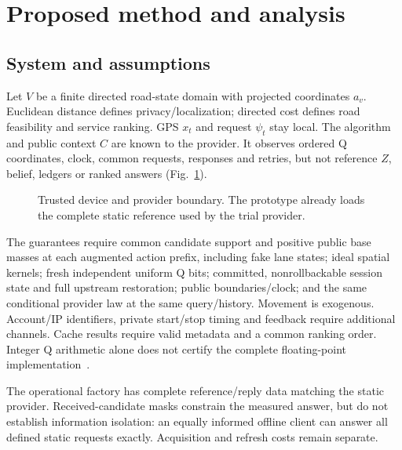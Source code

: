 \section{Proposed method and analysis}\label{sec:method}
\subsection{System and assumptions}\label{sec:system}
Let $V$ be a finite directed road-state domain with projected coordinates $a_v$.
Euclidean distance defines privacy/localization; directed cost defines road
feasibility and service ranking. GPS $x_t$ and request $\psi_t$ stay local.
The algorithm and public context $C$ are known to the provider.
It observes ordered Q coordinates, clock, common requests, responses
and retries, but not reference $Z$, belief, ledgers or ranked answers
(Fig.~\ref{fig:system}).

\begin{figure}[t]\centering
\resizebox{\columnwidth}{!}{}
\caption{Trusted device and provider boundary. The prototype already loads the
complete static reference used by the trial provider.}\label{fig:system}
\end{figure}

The guarantees require common candidate support and positive public base masses
at each augmented action prefix, including fake lane states; ideal spatial
kernels; fresh independent uniform Q bits; committed, nonrollbackable session
state and full upstream restoration; public boundaries/clock; and the same
conditional provider law at the same query/history. Movement is exogenous.
Account/IP identifiers, private start/stop timing and feedback require additional
channels. Cache results require valid metadata and a common ranking order.
Integer Q arithmetic alone does not certify the complete floating-point
implementation~\cite{mironov}.

The operational factory has complete reference/reply data matching the static
provider. Received-candidate masks constrain the measured answer, but do not
establish information isolation: an equally informed offline client can answer
all defined static requests exactly. Acquisition and refresh costs remain separate.

